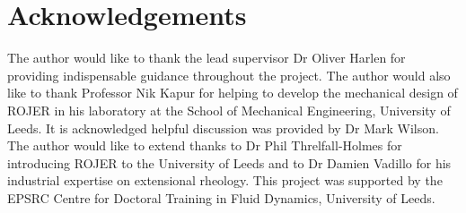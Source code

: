\documentclass[11pt]{article}
\begin{document}
\section{Acknowledgements}
The author would like to thank the lead supervisor Dr Oliver Harlen for 
providing indispensable guidance throughout the project. The author would also 
like to thank Professor Nik Kapur for helping to develop the mechanical design 
of ROJER in his laboratory at the School of Mechanical Engineering, University 
of Leeds. It is acknowledged helpful discussion was provided by Dr Mark Wilson. 
The author would like to extend thanks to Dr Phil Threlfall-Holmes for 
introducing ROJER to the University of Leeds and to Dr Damien Vadillo for his 
industrial expertise on extensional rheology. This project was supported by the 
EPSRC Centre for Doctoral Training in Fluid Dynamics, University of Leeds.

\newpage



\end{document}
